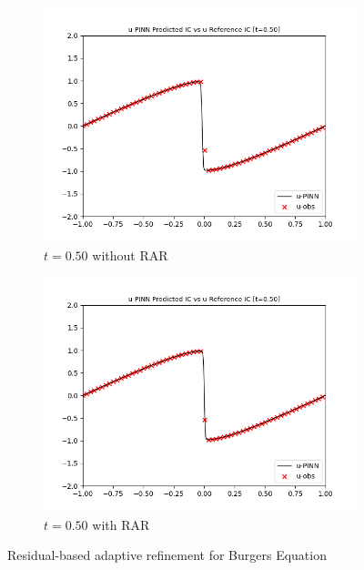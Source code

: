 \documentclass[letterpaper,11pt]{article}
\begin{document}
\begin{figure}[h]
\begin{subfigure}{0.45\textwidth}
            \includegraphics*[width=\textwidth]{burgers_forward_t0.50.png}
            \caption{$t = 0.50$ without RAR}
        \end{subfigure}
        \hfill
        \begin{subfigure}{0.45\textwidth}
            \includegraphics*[width=\textwidth]{burgers_forward_t0.50_rar.png}
            \caption{$t = 0.50$ with RAR}
        \end{subfigure}
        \caption{Residual-based adaptive refinement for Burgers Equation}
    \end{figure}
\end{document}
